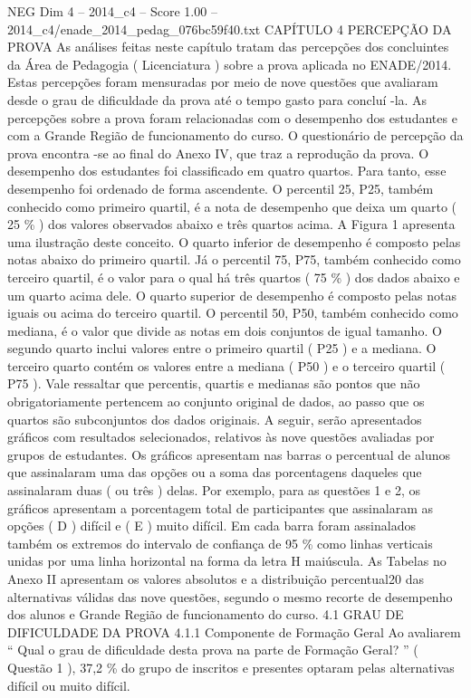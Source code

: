 \begin{textsample}{NEG Dim 4 – 2014\_c4 – Score 1.00 – 2014\_c4/enade\_2014\_pedag\_076bc59f40.txt}  \label{ex:f4_neg_156}
CAPÍTULO 4 PERCEPÇÃO DA PROVA As análises feitas neste capítulo tratam das percepções dos concluintes da Área de Pedagogia ( Licenciatura ) sobre a prova aplicada no ENADE/2014.
Estas percepções foram mensuradas por meio de nove questões que avaliaram desde o grau de dificuldade da prova até o tempo gasto para concluí -la.
As percepções sobre a prova foram relacionadas com o desempenho dos estudantes e com a Grande Região de funcionamento do curso.
O questionário de percepção da prova encontra -se ao final do Anexo IV, que traz a reprodução da prova.
O desempenho dos estudantes foi classificado em quatro quartos.
Para tanto, esse desempenho foi ordenado de forma ascendente.
O percentil 25, P25, também conhecido como primeiro quartil, é a nota de desempenho que deixa um quarto ( 25 \% ) dos valores observados abaixo e três quartos acima.
A Figura 1 apresenta uma ilustração deste conceito.
O quarto inferior de desempenho é composto pelas notas abaixo do primeiro quartil.
Já o percentil 75, P75, também conhecido como terceiro quartil, é o valor para o qual há três quartos ( 75 \% ) dos dados abaixo e um quarto acima dele.
O quarto superior de desempenho é composto pelas notas iguais ou acima do terceiro quartil.
O percentil 50, P50, também conhecido como mediana, é o valor que divide as notas em dois conjuntos de igual tamanho.
O segundo quarto inclui valores entre o primeiro quartil ( P25 ) e a mediana.
O terceiro quarto contém os valores entre a mediana ( P50 ) e o terceiro quartil ( P75 ).
Vale ressaltar que percentis, quartis e medianas são pontos que não obrigatoriamente pertencem ao conjunto original de dados, ao passo que os quartos são subconjuntos dos dados originais.
A seguir, serão apresentados gráficos com resultados selecionados, relativos às nove questões avaliadas por grupos de estudantes.
Os gráficos apresentam nas barras o percentual de alunos que assinalaram uma das opções ou a soma das porcentagens daqueles que assinalaram duas ( ou três ) delas.
Por exemplo, para as questões 1 e 2, os gráficos apresentam a porcentagem total de participantes que assinalaram as opções ( D ) difícil e ( E ) muito difícil.
Em cada barra foram assinalados também os extremos do intervalo de confiança de 95 \% como linhas verticais unidas por uma linha horizontal na forma da letra H maiúscula.
As Tabelas no Anexo II apresentam os valores absolutos e a distribuição percentual20 das alternativas válidas das nove questões, segundo o mesmo recorte de desempenho dos alunos e Grande Região de funcionamento do curso. 4.1 GRAU DE DIFICULDADE DA PROVA 4.1.1 Componente de Formação Geral Ao avaliarem “ Qual o grau de dificuldade desta prova na parte de Formação Geral? ” ( Questão 1 ), 37,2 \% do grupo de inscritos e presentes optaram pelas alternativas difícil ou muito difícil.

\end{textsample}

